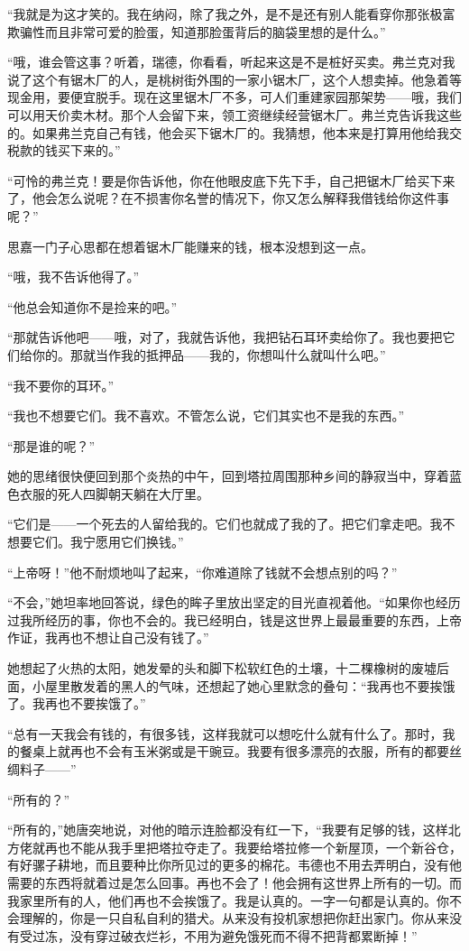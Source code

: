 \par “我就是为这才笑的。我在纳闷，除了我之外，是不是还有别人能看穿你那张极富欺骗性而且非常可爱的脸蛋，知道那脸蛋背后的脑袋里想的是什么。”
\par “哦，谁会管这事？听着，瑞德，你看看，听起来这是不是桩好买卖。弗兰克对我说了这个有锯木厂的人，是桃树街外围的一家小锯木厂，这个人想卖掉。他急着等现金用，要便宜脱手。现在这里锯木厂不多，可人们重建家园那架势——哦，我们可以用天价卖木材。那个人会留下来，领工资继续经营锯木厂。弗兰克告诉我这些的。如果弗兰克自己有钱，他会买下锯木厂的。我猜想，他本来是打算用他给我交税款的钱买下来的。”
\par “可怜的弗兰克！要是你告诉他，你在他眼皮底下先下手，自己把锯木厂给买下来了，他会怎么说呢？在不损害你名誉的情况下，你又怎么解释我借钱给你这件事呢？”
\par 思嘉一门子心思都在想着锯木厂能赚来的钱，根本没想到这一点。
\par “哦，我不告诉他得了。”
\par “他总会知道你不是捡来的吧。”
\par “那就告诉他吧——哦，对了，我就告诉他，我把钻石耳环卖给你了。我也要把它们给你的。那就当作我的抵押品——我的，你想叫什么就叫什么吧。”
\par “我不要你的耳环。”
\par “我也不想要它们。我不喜欢。不管怎么说，它们其实也不是我的东西。”
\par “那是谁的呢？”
\par 她的思绪很快便回到那个炎热的中午，回到塔拉周围那种乡间的静寂当中，穿着蓝色衣服的死人四脚朝天躺在大厅里。
\par “它们是——一个死去的人留给我的。它们也就成了我的了。把它们拿走吧。我不想要它们。我宁愿用它们换钱。”
\par “上帝呀！”他不耐烦地叫了起来，“你难道除了钱就不会想点别的吗？”
\par “不会，”她坦率地回答说，绿色的眸子里放出坚定的目光直视着他。“如果你也经历过我所经历的事，你也不会的。我已经明白，钱是这世界上最最重要的东西，上帝作证，我再也不想让自己没有钱了。”
\par 她想起了火热的太阳，她发晕的头和脚下松软红色的土壤，十二棵橡树的废墟后面，小屋里散发着的黑人的气味，还想起了她心里默念的叠句：“我再也不要挨饿了。我再也不要挨饿了。”
\par “总有一天我会有钱的，有很多钱，这样我就可以想吃什么就有什么了。那时，我的餐桌上就再也不会有玉米粥或是干豌豆。我要有很多漂亮的衣服，所有的都要丝绸料子——”
\par “所有的？”
\par “所有的，”她唐突地说，对他的暗示连脸都没有红一下，“我要有足够的钱，这样北方佬就再也不能从我手里把塔拉夺走了。我要给塔拉修一个新屋顶，一个新谷仓，有好骡子耕地，而且要种比你所见过的更多的棉花。韦德也不用去弄明白，没有他需要的东西将就着过是怎么回事。再也不会了！他会拥有这世界上所有的一切。而我家里所有的人，他们再也不会挨饿了。我是认真的。一字一句都是认真的。你不会理解的，你是一只自私自利的猎犬。从来没有投机家想把你赶出家门。你从来没有受过冻，没有穿过破衣烂衫，不用为避免饿死而不得不把背都累断掉！”
